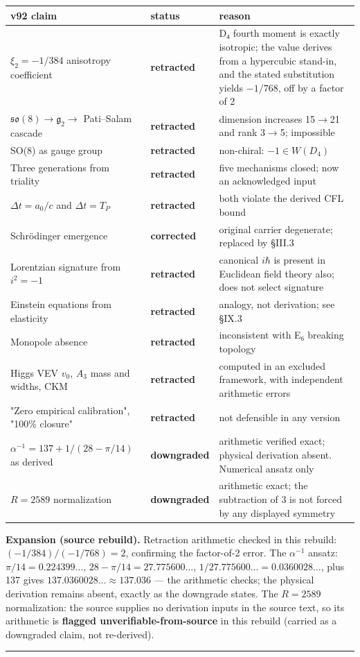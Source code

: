 \documentclass[a4paper,11pt]{article}
\newcommand{\expansion}[1]{\par\smallskip\noindent\textbf{Expansion (source rebuild).} #1\par\smallskip}
\begin{document}
\begin{center}
\begin{xltabular}{\linewidth}{llX}
\hline
v92 claim & status & reason \\
\hline
$\xi_2=-1/384$ anisotropy coefficient & \textbf{retracted} & D₄ fourth moment is exactly isotropic; the value derives from a hypercubic stand-in, and the stated substitution yields $-1/768$, off by a factor of 2 \\
$\mathfrak{so}(8)\to\mathfrak{g}_2\to$ Pati–Salam cascade & \textbf{retracted} & dimension increases 15$\to$21 and rank 3$\to$5; impossible \\
SO(8) as gauge group & \textbf{retracted} & non-chiral: $-1\in W(D_4)$ \\
Three generations from triality & \textbf{retracted} & five mechanisms closed; now an acknowledged input \\
$\Delta t=a_0/c$ and $\Delta t=T_P$ & \textbf{retracted} & both violate the derived CFL bound \\
Schrödinger emergence & \textbf{corrected} & original carrier degenerate; replaced by §III.3 \\
Lorentzian signature from $i^2=-1$ & \textbf{retracted} & canonical $i\hbar$ is present in Euclidean field theory also; does not select signature \\
Einstein equations from elasticity & \textbf{retracted} & analogy, not derivation; see §IX.3 \\
Monopole absence & \textbf{retracted} & inconsistent with E₆ breaking topology \\
Higgs VEV $v_0$, $A_3$ mass and widths, CKM & \textbf{retracted} & computed in an excluded framework, with independent arithmetic errors \\
"Zero empirical calibration", "100\% closure" & \textbf{retracted} & not defensible in any version \\
$\alpha^{-1}=137+1/(28-\pi/14)$ as derived & \textbf{downgraded} & arithmetic verified exact; physical derivation absent. Numerical ansatz only \\
$R=2589$ normalization & \textbf{downgraded} & arithmetic exact; the subtraction of 3 is not forced by any displayed symmetry \\
\hline
\end{xltabular}
\end{center}


\expansion{Retraction arithmetic checked in this rebuild: $(-1/384)/(-1/768) = 2$, confirming the factor-of-2 error. The $\alpha^{-1}$ ansatz: $\pi/14 = 0.224399\ldots$, $28 - \pi/14 = 27.775600\ldots$, $1/27.775600\ldots = 0.0360028\ldots$, plus 137 gives $137.0360028\ldots \approx 137.036$ --- the arithmetic checks; the physical derivation remains absent, exactly as the downgrade states. The $R = 2589$ normalization: the source supplies no derivation inputs in the source text, so its arithmetic is \textbf{flagged unverifiable-from-source} in this rebuild (carried as a downgraded claim, not re-derived).}
\medskip\hrule\medskip
\end{document}
